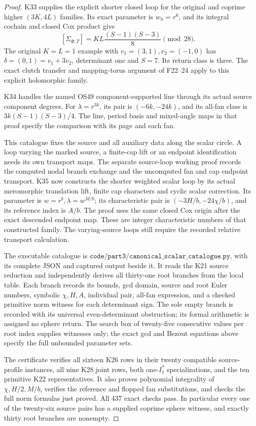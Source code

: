 \begin{proof}
\par\nobreak

K33 supplies the explicit shorter closed
loop for the original and coprime higher
\((3K,4L)\) families. Its exact parameter
is \(w_h=r^6\), and its integral cochain
and closed Cox product give
\[
 [\Sigma_{\Phi,T}]
       =KL\frac{(S-1)(S-3)}8 \pmod {28}.
\]
The original \(K=L=1\) example with
\(v_1=(3,1),v_2=(-1,0)\) has
\(\delta=(0,1)=v_1+3v_2\), determinant
one and \(S=7\). Its return class is
three. The exact clutch transfer and
mapping-torus argument of F22--24 apply
to this explicit holomorphic family.

K34 handles the named OS49
component-supported line through its
actual source component degrees. For
\(\lambda=r^{3k}\), its pair is
\((-6k,-24k)\), and its all-fan class
is \(3k(S-1)(S-3)/4\). The line,
period basis and mixed-angle maps
in that proof specify the comparison
with its page and each fan.

This catalogue fixes the source and
all auxiliary data along the scalar
circle. A loop varying the marked
source, a finite-cap lift or an
endpoint identification needs its
own transport maps. The separate
source-loop working proof records
the computed nodal branch exchange
and the uncomputed fan and cap
endpoint transport. K35 now constructs the shorter
weighted scalar loop by its actual
meromorphic translation lift, finite
cap characters and cyclic scalar
correction. Its parameter is
\(w=r^b,\lambda=w^{M/b}\); its
characteristic pair is
\((-3H/b,-24\chi/b)\), and its
reference index is \(A/b\).
The proof uses the same closed Cox
origin after the exact descended
endpoint map. These are integer
characteristic numbers of that
constructed family. The varying-source
loops still require the recorded
relative transport calculation.

The executable catalogue is
\(\texttt{code/part3/canonical\_scalar\_catalogue.py}\),
with its complete JSON and captured output beside it.
It reads the K21 source reduction and independently
derives all thirty-one root branches from the local
table. Each branch records its bounds, gcd domain,
source and root Euler numbers, symbolic
\(\chi,H,A\), individual pair, all-fan expression,
and a checked primitive norm witness for each
determinant sign. The sole empty branch is recorded
with its universal even-determinant obstruction;
its formal arithmetic is assigned no sphere return.
The search box of twenty-five consecutive values
per root index supplies witnesses only; the exact
gcd and Bezout equations above specify the full
unbounded parameter sets.

The certificate verifies all sixteen K26 rows in
their twenty compatible source-profile instances,
all nine K28 joint rows, both one-\(I_1^*\)
specializations, and the ten primitive K22
representatives. It also proves polynomial
integrality of \(\chi,H/2,M/b\), verifies
the reference and flopped fan substitutions, and
checks the full norm formulas just proved.
All 437 exact checks pass. In particular every
one of the twenty-six source pairs has a supplied
coprime sphere witness, and exactly thirty
root branches are nonempty.
\end{proof}
